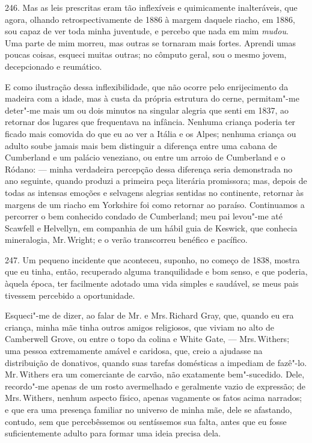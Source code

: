 246. Mas as leis prescritas eram tão inflexíveis e quimicamente
inalteráveis, que agora, olhando retrospectivamente de 1886 à margem
daquele riacho, em 1886, sou capaz de ver toda minha juventude, e
percebo que nada em mim \emph{mudou}. Uma parte de mim morreu, mas
outras se tornaram mais fortes. Aprendi umas poucas coisas, esqueci
muitas outras; no cômputo geral, sou o mesmo jovem, decepcionado e
reumático.

E como ilustração dessa inflexibilidade, que não ocorre pelo
enrijecimento da madeira com a idade, mas à custa da própria estrutura
do cerne, permitam"-me deter"-me mais um ou dois minutos na singular
alegria que senti em 1837, ao retornar dos lugares que frequentava na
infância. Nenhuma criança poderia ter ficado mais comovida do que eu ao
ver a Itália e os Alpes; nenhuma criança ou adulto soube jamais mais bem
distinguir a diferença entre uma cabana de Cumberland e um palácio
veneziano, ou entre um arroio de Cumberland e o Ródano: --- minha
verdadeira percepção dessa diferença seria demonstrada no ano seguinte,
quando produzi a primeira peça literária promissora; mas, depois de
todas as intensas emoções e selvagens alegrias sentidas no continente,
retornar às margens de um riacho em Yorkshire foi como retornar ao
paraíso. Continuamos a percorrer o bem conhecido condado de Cumberland;
meu pai levou"-me até Scawfell e Helvellyn, em companhia de um hábil guia
de Keswick, que conhecia mineralogia, Mr.\,Wright; e o verão transcorreu
benéfico e pacífico.

247. Um pequeno incidente que aconteceu, suponho, no começo de 1838,
mostra que eu tinha, então, recuperado alguma tranquilidade e bom senso,
e que poderia, àquela época, ter facilmente adotado uma vida simples e
saudável, se meus pais tivessem percebido a oportunidade.

Esqueci"-me de dizer, ao falar de Mr. e Mrs.\,Richard Gray, que, quando eu
era criança, minha mãe tinha outros amigos religiosos, que viviam no
alto de Camberwell Grove, ou entre o topo da colina e White Gate, --- Mrs.\,Withers; uma pessoa extremamente amável e caridosa, que, creio a
ajudasse na distribuição de donativos, quando suas tarefas domésticas a
impediam de fazê"-lo. Mr.\,Withers era um comerciante de carvão, não
exatamente bem"-sucedido. Dele, recordo"-me apenas de um rosto avermelhado
e geralmente vazio de expressão; de Mrs.\,Withers, nenhum aspecto físico,
apenas vagamente os fatos acima narrados; e que era uma presença
familiar no universo de minha mãe, dele se afastando, contudo, sem que
percebêssemos ou sentíssemos sua falta, antes que eu fosse
suficientemente adulto para formar uma ideia precisa dela.

